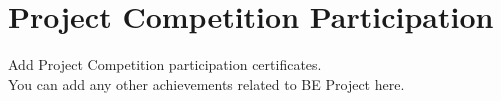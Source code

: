\chapter{Project Competition Participation}

Add Project Competition participation certificates.\\
You can add any other achievements related to BE Project here.